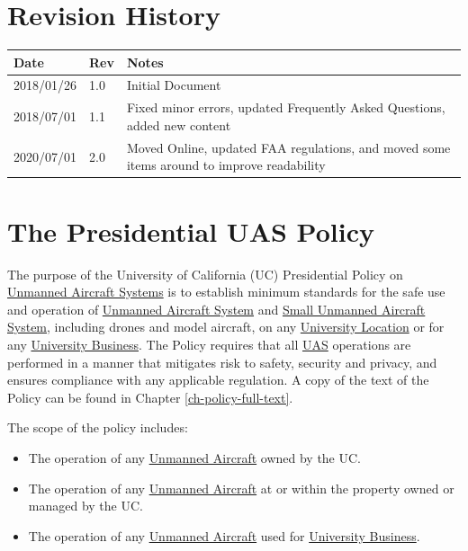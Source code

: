\documentclass[
]{book}
\providecommand{\tightlist}{%
  \setlength{\itemsep}{0pt}\setlength{\parskip}{0pt}}
\begin{document}
\hypertarget{revision-history}{%
\chapter*{Revision History}\label{revision-history}}

\begin{longtable}[]{@{}lll@{}}
\toprule
Date & Rev & Notes\tabularnewline
\midrule
\endhead
2018/01/26 & 1.0 & Initial Document\tabularnewline
2018/07/01 & 1.1 & Fixed minor errors, updated Frequently Asked Questions, added new content\tabularnewline
2020/07/01 & 2.0 & Moved Online, updated FAA regulations, and moved some items around to improve readability\tabularnewline
\bottomrule
\end{longtable}

\hypertarget{ch-policy}{%
\chapter{The Presidential UAS Policy}\label{ch-policy}}

The purpose of the University of California (UC) Presidential Policy on \protect\hyperlink{UAS}{Unmanned Aircraft Systems} is to establish minimum standards for the safe use and operation of \protect\hyperlink{UAS}{Unmanned Aircraft System} and \protect\hyperlink{sUAS}{Small Unmanned Aircraft System}, including drones and model aircraft, on any \protect\hyperlink{UL}{University Location} or for any \protect\hyperlink{UB}{University Business}. The Policy requires that all \protect\hyperlink{UAS}{UAS} operations are performed in a manner that mitigates risk to safety, security and privacy, and ensures compliance with any applicable regulation. A copy of the text of the Policy can be found in Chapter \ref{ch-policy-full-text}.

The scope of the policy includes:

\begin{itemize}
\tightlist
\item
  The operation of any \protect\hyperlink{UA}{Unmanned Aircraft} owned by the UC.
\item
  The operation of any \protect\hyperlink{UA}{Unmanned Aircraft} at or within the property owned or managed by the UC.
\item
  The operation of any \protect\hyperlink{UA}{Unmanned Aircraft} used for \protect\hyperlink{UB}{University Business}.
\end{itemize}
\end{document}
